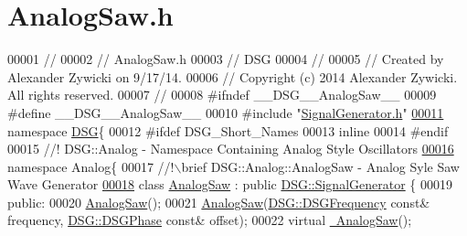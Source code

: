 \hypertarget{_analog_saw_8h_source}{\section{Analog\+Saw.\+h}
\label{_analog_saw_8h_source}
}

\begin{DoxyCode}
00001 \textcolor{comment}{//}
00002 \textcolor{comment}{//  AnalogSaw.h}
00003 \textcolor{comment}{//  DSG}
00004 \textcolor{comment}{//}
00005 \textcolor{comment}{//  Created by Alexander Zywicki on 9/17/14.}
00006 \textcolor{comment}{//  Copyright (c) 2014 Alexander Zywicki. All rights reserved.}
00007 \textcolor{comment}{//}
00008 \textcolor{preprocessor}{#ifndef \_\_DSG\_\_AnalogSaw\_\_}
00009 \textcolor{preprocessor}{#define \_\_DSG\_\_AnalogSaw\_\_}
00010 \textcolor{preprocessor}{#include "\hyperlink{_signal_generator_8h}{SignalGenerator.h}"}
\hypertarget{_analog_saw_8h_source_l00011}{}\hyperlink{namespace_d_s_g}{00011} \textcolor{keyword}{namespace }\hyperlink{namespace_d_s_g}{DSG}\{
00012 \textcolor{preprocessor}{#ifdef DSG\_Short\_Names}
00013     \textcolor{keyword}{inline}
00014 \textcolor{preprocessor}{#endif}
00015 \textcolor{comment}{    //! DSG::Analog - Namespace Containing Analog Style Oscillators}
\hypertarget{_analog_saw_8h_source_l00016}{}\hyperlink{namespace_d_s_g_1_1_analog}{00016} \textcolor{comment}{}    \textcolor{keyword}{namespace }Analog\{\textcolor{comment}{}
00017 \textcolor{comment}{        //!\(\backslash\)brief DSG::Analog::AnalogSaw - Analog Syle Saw Wave Generator}
\hypertarget{_analog_saw_8h_source_l00018}{}\hyperlink{class_d_s_g_1_1_analog_1_1_analog_saw}{00018} \textcolor{comment}{}        \textcolor{keyword}{class }\hyperlink{class_d_s_g_1_1_analog_1_1_analog_saw}{AnalogSaw} : \textcolor{keyword}{public} \hyperlink{class_d_s_g_1_1_signal_generator}{DSG::SignalGenerator} \{
00019         \textcolor{keyword}{public}:
00020             \hyperlink{class_d_s_g_1_1_analog_1_1_analog_saw_abcb0b997be32413da0d14b93aeeb9c17}{AnalogSaw}();
00021             \hyperlink{class_d_s_g_1_1_analog_1_1_analog_saw_abcb0b997be32413da0d14b93aeeb9c17}{AnalogSaw}(\hyperlink{namespace_d_s_g_a4315a061386fa1014fda09b15d3a6973}{DSG::DSGFrequency} \textcolor{keyword}{const}& frequency,
      \hyperlink{namespace_d_s_g_a44431ce1eb0a7300efdd207bc879e52c}{DSG::DSGPhase} \textcolor{keyword}{const}& offset);
00022             \textcolor{keyword}{virtual} \hyperlink{class_d_s_g_1_1_analog_1_1_analog_saw_a42a5fe22e0c3b9d1bd3996fe5bbd24ba}{~AnalogSaw}();

\end{DoxyCode}
